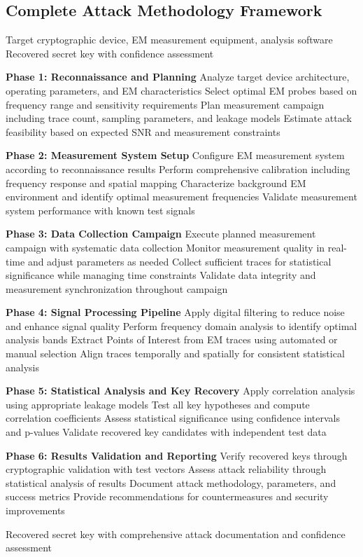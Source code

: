 \documentclass[11pt,a4paper]{article}
\theoremstyle{definition}
\begin{document}
\subsection{Complete Attack Methodology Framework}

\begin{algorithm}
\caption{Comprehensive EM Analysis Attack Methodology}
\begin{algorithmic}[1]
\REQUIRE Target cryptographic device, EM measurement equipment, analysis software
\ENSURE Recovered secret key with confidence assessment

\STATE \textbf{Phase 1: Reconnaissance and Planning}
\STATE Analyze target device architecture, operating parameters, and EM characteristics
\STATE Select optimal EM probes based on frequency range and sensitivity requirements
\STATE Plan measurement campaign including trace count, sampling parameters, and leakage models
\STATE Estimate attack feasibility based on expected SNR and measurement constraints

\STATE \textbf{Phase 2: Measurement System Setup}
\STATE Configure EM measurement system according to reconnaissance results
\STATE Perform comprehensive calibration including frequency response and spatial mapping
\STATE Characterize background EM environment and identify optimal measurement frequencies
\STATE Validate measurement system performance with known test signals

\STATE \textbf{Phase 3: Data Collection Campaign}
\STATE Execute planned measurement campaign with systematic data collection
\STATE Monitor measurement quality in real-time and adjust parameters as needed
\STATE Collect sufficient traces for statistical significance while managing time constraints
\STATE Validate data integrity and measurement synchronization throughout campaign

\STATE \textbf{Phase 4: Signal Processing Pipeline}
\STATE Apply digital filtering to reduce noise and enhance signal quality
\STATE Perform frequency domain analysis to identify optimal analysis bands
\STATE Extract Points of Interest from EM traces using automated or manual selection
\STATE Align traces temporally and spatially for consistent statistical analysis

\STATE \textbf{Phase 5: Statistical Analysis and Key Recovery}
\STATE Apply correlation analysis using appropriate leakage models
\STATE Test all key hypotheses and compute correlation coefficients
\STATE Assess statistical significance using confidence intervals and p-values
\STATE Validate recovered key candidates with independent test data

\STATE \textbf{Phase 6: Results Validation and Reporting}
\STATE Verify recovered keys through cryptographic validation with test vectors
\STATE Assess attack reliability through statistical analysis of results
\STATE Document attack methodology, parameters, and success metrics
\STATE Provide recommendations for countermeasures and security improvements

\RETURN Recovered secret key with comprehensive attack documentation and confidence assessment
\end{algorithmic}
\end{algorithm}
\end{document}

